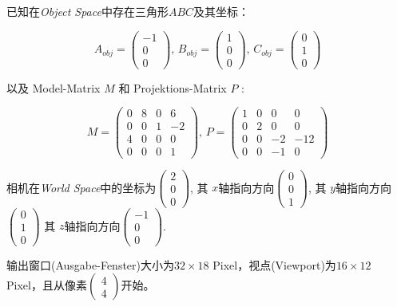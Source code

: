 \documentclass[fleqn]{article}
\begin{document}
\noindent 已知在\textit{Object Space}中存在三角形$ABC$及其坐标：

$$A_{obj}=\begin{pmatrix}
    -1\\0\\0
\end{pmatrix},\,B_{obj}=\begin{pmatrix}
    1\\0\\0
\end{pmatrix},\,C_{obj}=\begin{pmatrix}
    0\\1\\0
\end{pmatrix}$$

\noindent 以及 Model-Matrix $M$ 和 Projektions-Matrix $P$ :

$$M=\begin{pmatrix}
    0&8&0&6\\
    0&0&1&-2\\
    4&0&0&0\\
    0&0&0&1
\end{pmatrix},\,P=\begin{pmatrix}
    1&0&0&0\\
    0&2&0&0\\
    0&0&-2&-12\\
    0&0&-1&0
\end{pmatrix}$$

\noindent 相机在\textit{World Space}中的坐标为$\begin{pmatrix}
    2\\0\\0
\end{pmatrix}$, 其 $x$轴指向方向$\begin{pmatrix}
    0\\0\\1
\end{pmatrix}$, 其 $y$轴指向方向$\begin{pmatrix}
    0\\1\\0
\end{pmatrix}$ 其 $z$轴指向方向$\begin{pmatrix}
    -1\\0\\0
\end{pmatrix}$.

\noindent 输出窗口(Ausgabe-Fenster)大小为$32\times18$ Pixel，视点(Viewport)为$16\times12$ Pixel，且从像素$\begin{pmatrix}
    4\\4
\end{pmatrix}$开始。
\end{document}
